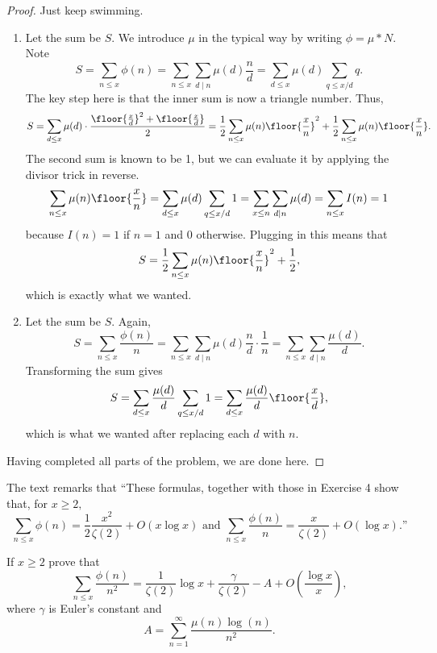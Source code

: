 \begin{proof}
Just keep swimming.
\begin{enumerate}[label=(\alph*)]
    \item Let the sum be $S.$ We introduce $\mu$ in the typical way by writing $\phi=\mu*N.$ Note
    \[S=\sum_{n\le x}\phi(n)=\sum_{n\le x}\sum_{d\mid n}\mu(d)\frac nd=\sum_{d\le x}\mu(d)\sum_{q\le x/d}q.\]
    The key step here is that the inner sum is now a triangle number. Thus,
    \[S=\sum_{d\le x}\mu(d)\cdot\frac{\floor{\frac xd}^2+\floor{\frac xd}}2=\frac12\sum_{n\le x}\mu(n)\floor{\frac xn}^2+\frac12\sum_{n\le x}\mu(n)\floor{\frac xn}.\]
    The second sum is known to be 1, but we can evaluate it by applying the divisor trick in reverse.
    \[\sum_{n\le x}\mu(n)\floor{\frac xn}=\sum_{d\le x}\mu(d)\sum_{q\le x/d}1=\sum_{x\le n}\sum_{d\mid n}\mu(d)=\sum_{n\le x}I(n)=1\]
    because $I(n)=1$ if $n=1$ and 0 otherwise. Plugging in this means that
    \[S=\frac12\sum_{n\le x}\mu(n)\floor{\frac xn}^2+\frac12,\]
    which is exactly what we wanted.
    \item Let the sum be $S.$ Again,
    \[S=\sum_{n\le x}\frac{\phi(n)}n=\sum_{n\le x}\sum_{d\mid n}\mu(d)\frac nd\cdot\frac1n=\sum_{n\le x}\sum_{d\mid n}\frac{\mu(d)}d.\]
    Transforming the sum gives
    \[S=\sum_{d\le x}\frac{\mu(d)}d\sum_{q\le x/d}1=\sum_{d\le x}\frac{\mu(d)}d\floor{\frac xd},\]
    which is what we wanted after replacing each $d$ with $n.$
\end{enumerate}
Having completed all parts of the problem, we are done here.
\end{proof}

The text remarks that ``These formulas, together with those in Exercise 4 show that, for $x\ge2,$
\[\sum_{n\le x}\phi(n)=\frac12\frac{x^2}{\zeta(2)}+O(x\log x)\text{ and }\sum_{n\le x}\frac{\phi(n)}n=\frac x{\zeta(2)}+O(\log x).\text{''}\]

\begin{exercise}
If $x\ge2$ prove that
\[\sum_{n\le x}\frac{\phi(n)}{n^2}=\frac1{\zeta(2)}\log x+\frac{\gamma}{\zeta(2)}-A+O\left(\frac{\log x}x\right),\]
where $\gamma$ is Euler's constant and
\[A=\sum_{n=1}^\infty\frac{\mu(n)\log(n)}{n^2}.\]
\end{exercise}

